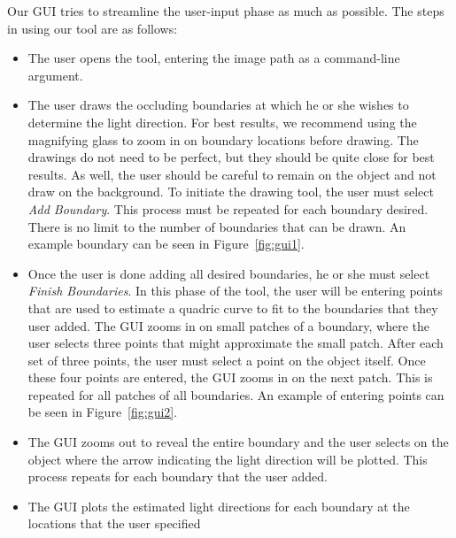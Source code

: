 \documentclass[10pt,twocolumn,letterpaper]{article}
\begin{document}
Our GUI tries to streamline the user-input phase as much as possible. The steps in using our tool are as follows:
\begin{itemize}
\item The user opens the tool, entering the image path as a command-line argument.

\item The user draws the occluding boundaries at which he or she wishes to determine the light direction. For best results, we recommend using the magnifying glass to zoom in on boundary locations before drawing. The drawings do not need to be perfect, but they should be quite close for best results. As well, the user should be careful to remain on the object and not draw on the background. To initiate the drawing tool, the user must select \emph{Add Boundary}. This process must be repeated for each boundary desired. There is no limit to the number of boundaries that can be drawn. An example boundary can be seen in Figure~\ref{fig:gui1}.
%

\item Once the user is done adding all desired boundaries, he or she must select \emph{Finish Boundaries}. In this phase of the tool, the user will be entering points that are used to estimate a quadric curve to fit to the boundaries that they user added. The GUI zooms in on small patches of a boundary, where the user selects three points that might approximate the small patch. After each set of three points, the user must select a point on the object itself. Once these four points are entered, the GUI zooms in on the next patch. This is repeated for all patches of all boundaries. An example of entering points can be seen in Figure~\ref{fig:gui2}.


\item The GUI zooms out to reveal the entire boundary and the user selects on the object where the arrow indicating the light direction will be plotted. This process repeats for each boundary that the user added.

\item The GUI plots the estimated light directions for each boundary at the locations that the user specified

\end{itemize}
\end{document}
